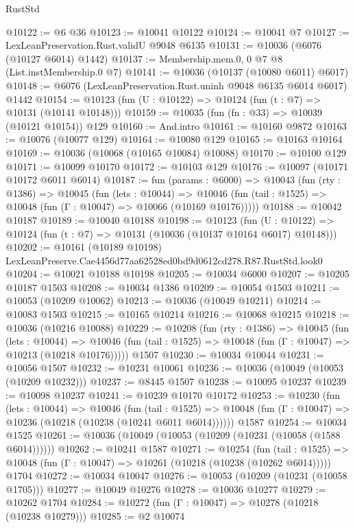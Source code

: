 \begin{lexlean}{RustStd}
\begin{coremodule}
{{@10122 := @6 @36
@10123 := @10041 @10122
@10124 := @10041 @7
@10127 := LexLeanPreservation.Rust.validU @9048 @6135
@10131 := @10036 (@6076 (@10127 @6014) @1442)
@10137 := Membership.mem.{0, 0} @7 @8 (List.instMembership.{0} @7)
@10141 := @10036 (@10137 (@10080 @6011) @6017)
@10148 := @6076 (LexLeanPreservation.Rust.uninh @9048 @6135 @6014 @6017) @1442
@10154 := @10123 (fun (U : @10122) => @10124 (fun (t : @7) => @10131 (@10141 @10148)))
@10159 := @10035 (fun (fn : @33) => @10039 (@10121 @10154)) @129
@10160 := And.intro
@10161 := @10160 @9872
@10163 := @10076 (@10077 @129)
@10164 := @10080 @129
@10165 := @10163 @10164
@10169 := @10036 (@10068 (@10165 @10084) @10088)
@10170 := @10100 @129
@10171 := @10099 @10170
@10172 := @10103 @129
@10176 := @10097 (@10171 @10172 @6011 @6014)
@10187 := fun (params : @6000) =>
  @10043
    (fun (rty : @1386) =>
    @10045
      (fun (lets : @10044) =>
      @10046 (fun (tail : @1525) => @10048 (fun (Γ : @10047) => @10066 (@10169 @10176)))))
@10188 := @10042 @10187
@10189 := @10040 @10188
@10198 := @10123
    (fun (U : @10122) => @10124 (fun (t : @7) => @10131 (@10036 (@10137 @10164 @6017) @10148)))
@10202 := @10161 (@10189 @10198) LexLeanPreserve.Cae4456d77aa62528ed0bd9d0612cd278.R87.RustStd.look0
@10204 := @10021 @10188 @10198
@10205 := @10034 @6000
@10207 := @10205 @10187 @1503
@10208 := @10034 @1386
@10209 := @10054 @1503
@10211 := @10053 (@10209 @10062)
@10213 := @10036 (@10049 @10211)
@10214 := @10083 @1503
@10215 := @10165 @10214
@10216 := @10068 @10215
@10218 := @10036 (@10216 @10088)
@10229 := @10208
    (fun (rty : @1386) =>
    @10045
      (fun (lets : @10044) =>
      @10046 (fun (tail : @1525) => @10048 (fun (Γ : @10047) => @10213 (@10218 @10176)))))
    @1507
@10230 := @10034 @10044
@10231 := @10056 @1507
@10232 := @10231 @10061
@10236 := @10036 (@10049 (@10053 (@10209 @10232)))
@10237 := @8445 @1507
@10238 := @10095 @10237
@10239 := @10098 @10237
@10241 := @10239 @10170 @10172
@10253 := @10230
    (fun (lets : @10044) =>
    @10046
      (fun (tail : @1525) =>
      @10048 (fun (Γ : @10047) => @10236 (@10218 (@10238 (@10241 @6011 @6014))))))
    @1587
@10254 := @10034 @1525
@10261 := @10036 (@10049 (@10053 (@10209 (@10231 (@10058 (@1588 @6014))))))
@10262 := @10241 @1587
@10271 := @10254
    (fun (tail : @1525) => @10048 (fun (Γ : @10047) => @10261 (@10218 (@10238 (@10262 @6014)))))
    @1704
@10272 := @10034 @10047
@10276 := @10053 (@10209 (@10231 (@10058 @1705)))
@10277 := @10049 @10276
@10278 := @10036 @10277
@10279 := @10262 @1704
@10284 := @10272 (fun (Γ : @10047) => @10278 (@10218 (@10238 @10279)))
@10285 := @2 @10074
}}
\end{coremodule}
\end{lexlean}
